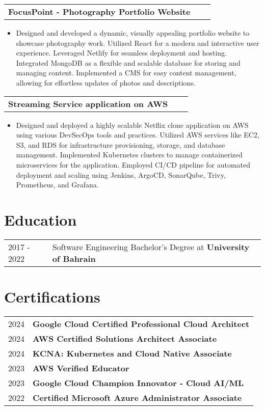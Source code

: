 \documentclass[a4paper,11pt]{article}
\makeatletter
\newenvironment{projectlong}[2]
    {
    \begin{tabularx}{\linewidth}{@{}l X r@{}}
    \textbf{#1} & \hfill &  #2 \\[3.75pt]
    \end{tabularx}
    \begin{minipage}[t]{\linewidth}
    \begin{itemize}[nosep,after=\strut, leftmargin=1em, itemsep=3pt,label=--]
    }
    {
    \end{itemize}
    \end{minipage}    
    }
\makeatother
\begin{document}
\begin{projectlong}{FocusPoint - Photography Portfolio Website}{}
    \item Designed and developed a dynamic, visually appealing portfolio website to showcase photography work.
Utilized React for a modern and interactive user experience.
Leveraged Netlify for seamless deployment and hosting.
Integrated MongoDB as a flexible and scalable database for storing and managing content.
Implemented a CMS for easy content management, allowing for effortless updates of photos and descriptions.
\end{projectlong}

\begin{projectlong}{Streaming Service application on AWS }{}
    \item Designed and deployed a highly scalable Netflix clone application on AWS using various DevSecOps tools and practices.
Utilized AWS services like EC2, S3, and RDS for infrastructure provisioning, storage, and database management.
Implemented Kubernetes clusters to manage containerized microservices for the application. Employed CI/CD  pipeline for automated deployment and scaling using Jenkins, ArgoCD, SonarQube, Trivy, Prometheus, and Grafana.
\end{projectlong}


\section{Education}
\begin{tabularx}{\linewidth}{@{}l X@{}}	
2017 - 2022 & Software Engineering Bachelor's Degree at \textbf{University of Bahrain}  \\ 
\end{tabularx}

\section{Certifications}
\begin{tabularx}{\linewidth}{@{}l X@{}}	
2024 & \textbf{Google Cloud Certified Professional Cloud Architect} \\
2024 & \textbf{AWS Certified Solutions Architect Associate}  \\
2024 & \textbf{KCNA: Kubernetes and Cloud Native Associate}  \\ 
2023 & \textbf{AWS Verified Educator}  \\ 
2023 & \textbf{Google Cloud Champion Innovator - Cloud AI/ML}  \\ 
2022 & \textbf{Certified Microsoft Azure Administrator Associate}  \\ 
\end{tabularx}
\end{document}
